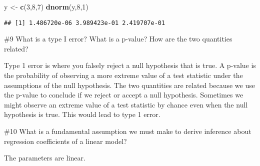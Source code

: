 \documentclass[
]{article}
\newenvironment{Shaded}{\begin{snugshade}}{\end{snugshade}}
\newcommand{\DecValTok}[1]{\textcolor[rgb]{0.00,0.00,0.81}{#1}}
\newcommand{\KeywordTok}[1]{\textcolor[rgb]{0.13,0.29,0.53}{\textbf{#1}}}
\newcommand{\NormalTok}[1]{#1}
\newcommand{\StringTok}[1]{\textcolor[rgb]{0.31,0.60,0.02}{#1}}
\begin{document}
\begin{Shaded}
\begin{Highlighting}[]
\NormalTok{y <-}\StringTok{ }\KeywordTok{c}\NormalTok{(}\DecValTok{3}\NormalTok{,}\DecValTok{8}\NormalTok{,}\DecValTok{7}\NormalTok{)}
\KeywordTok{dnorm}\NormalTok{(y,}\DecValTok{8}\NormalTok{,}\DecValTok{1}\NormalTok{)}
\end{Highlighting}
\end{Shaded}

\begin{verbatim}
## [1] 1.486720e-06 3.989423e-01 2.419707e-01
\end{verbatim}

\#9 What is a type I error? What is a p-value? How are the two
quantities related?

Type 1 error is where you falsely reject a null hypothesis that is true.
A p-value is the probability of observing a more extreme value of a test
statistic under the assumptions of the null hypothesis. The two
quantities are related because we use the p-value to conclude if we
reject or accept a null hypothesis. Sometimes we might observe an
extreme value of a test statistic by chance even when the null
hypothesis is true. This would lead to type 1 error.

\#10 What is a fundamental assumption we must make to derive inference
about regression coefficients of a linear model?

The parameters are linear.
\end{document}
